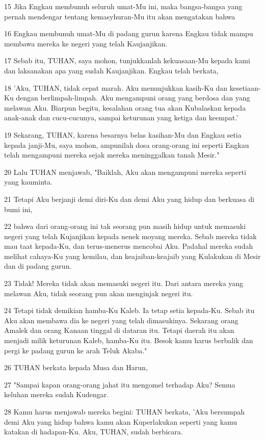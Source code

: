 \par 15 Jika Engkau membunuh seluruh umat-Mu ini, maka bangsa-bangsa yang pernah mendengar tentang kemasyhuran-Mu itu akan mengatakan bahwa
\par 16 Engkau membunuh umat-Mu di padang gurun karena Engkau tidak mampu membawa mereka ke negeri yang telah Kaujanjikan.
\par 17 Sebab itu, TUHAN, saya mohon, tunjukkanlah kekuasaan-Mu kepada kami dan laksanakan apa yang sudah Kaujanjikan. Engkau telah berkata,
\par 18 'Aku, TUHAN, tidak cepat marah. Aku menunjukkan kasih-Ku dan kesetiaan-Ku dengan berlimpah-limpah. Aku mengampuni orang yang berdosa dan yang melawan Aku. Biarpun begitu, kesalahan orang tua akan Kubalaskan kepada anak-anak dan cucu-cucunya, sampai keturunan yang ketiga dan keempat.'
\par 19 Sekarang, TUHAN, karena besarnya belas kasihan-Mu dan Engkau setia kepada janji-Mu, saya mohon, ampunilah dosa orang-orang ini seperti Engkau telah mengampuni mereka sejak mereka meninggalkan tanah Mesir."
\par 20 Lalu TUHAN menjawab, "Baiklah, Aku akan mengampuni mereka seperti yang kauminta.
\par 21 Tetapi Aku berjanji demi diri-Ku dan demi Aku yang hidup dan berkuasa di bumi ini,
\par 22 bahwa dari orang-orang ini tak seorang pun masih hidup untuk memasuki negeri yang telah Kujanjikan kepada nenek moyang mereka. Sebab mereka tidak mau taat kepada-Ku, dan terus-menerus mencobai Aku. Padahal mereka sudah melihat cahaya-Ku yang kemilau, dan keajaiban-keajaib yang Kulakukan di Mesir dan di padang gurun.
\par 23 Tidak! Mereka tidak akan memasuki negeri itu. Dari antara mereka yang melawan Aku, tidak seorang pun akan menginjak negeri itu.
\par 24 Tetapi tidak demikian hamba-Ku Kaleb. Ia tetap setia kepada-Ku. Sebab itu Aku akan membawa dia ke negeri yang telah dimasukinya. Sekarang orang Amalek dan orang Kanaan tinggal di dataran itu. Tetapi daerah itu akan menjadi milik keturunan Kaleb, hamba-Ku itu. Besok kamu harus berbalik dan pergi ke padang gurun ke arah Teluk Akaba."
\par 26 TUHAN berkata kepada Musa dan Harun,
\par 27 "Sampai kapan orang-orang jahat itu mengomel terhadap Aku? Semua keluhan mereka sudah Kudengar.
\par 28 Kamu harus menjawab mereka begini: TUHAN berkata, 'Aku bersumpah demi Aku yang hidup bahwa kamu akan Kuperlakukan seperti yang kamu katakan di hadapan-Ku. Aku, TUHAN, sudah berbicara.
